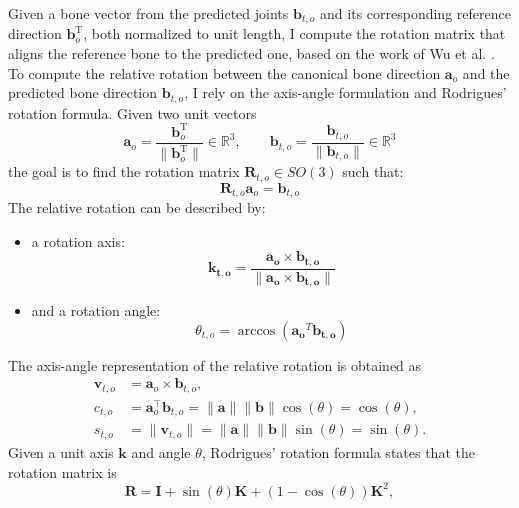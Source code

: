 Given a bone vector from the predicted joints $\mathbf{b}_{t,o}$ and its corresponding reference direction $\mathbf{b}^{\text{T}}_o$, both normalized to unit length, I compute the rotation matrix that aligns the reference bone to the 
predicted one, based on the work of Wu et al. \cite{wu2021rotation}.\\ 
To compute the relative rotation between the canonical bone direction $\mathbf{a}_o$ and the predicted bone direction $\mathbf{b}_{t,o}$, I rely on the axis-angle formulation and Rodrigues' rotation formula.
Given two unit vectors
\begin{equation}
    \mathbf{a}_o = \frac{\mathbf{b}^{\text{T}}_o}{\|\mathbf{b}^{\text{T}}_o\|} \in \mathbb{R}^3, 
    \qquad
    \mathbf{b}_{t,o} = \frac{\mathbf{b}_{t,o}}{\|\mathbf{b}_{t,o}\|} \in \mathbb{R}^3
\end{equation}
the goal is to find the rotation matrix $\mathbf{R}_{t,o} \in SO(3)$ such that:
\begin{equation}
    \mathbf{R}_{t,o}\mathbf{a}_o = \mathbf{b}_{t,o}
\end{equation}
The relative rotation can be described by:
\begin{itemize}
    \item a rotation axis: \begin{equation}
                            \mathbf{k_{t,o}} = \frac{\mathbf{a_o} \times \mathbf{b_{t,o}}}{\|\mathbf{a_o} \times \mathbf{b_{t,o}}\|}
                            \end{equation}
    \item and a rotation angle: \begin{equation}
                                \theta_{t,o} = \arccos(\mathbf{a_o}^T \mathbf{b_{t,o}})
                                \end{equation}
\end{itemize}
The axis-angle representation of the relative rotation is obtained as
\begin{align}
    \mathbf{v}_{t,o} &= \mathbf{a}_o \times \mathbf{b}_{t,o}, \\
    c_{t,o} &= \mathbf{a}_o^\top \mathbf{b}_{t,o} = \|\mathbf{a}\|\|\mathbf{b}\|\cos(\theta) = \cos(\theta), \\
    s_{t,o} &= \|\mathbf{v}_{t,o}\| = \|\mathbf{a}\|\|\mathbf{b}\|\sin(\theta) = \sin(\theta).
\end{align}
Given a unit axis $\mathbf{k}$ and angle $\theta$, Rodrigues' rotation formula states that the rotation matrix is
\begin{equation}
    \mathbf{R} = \mathbf{I} + \sin(\theta) \mathbf{K} + (1 - \cos(\theta)) \mathbf{K}^2,
\end{equation}
